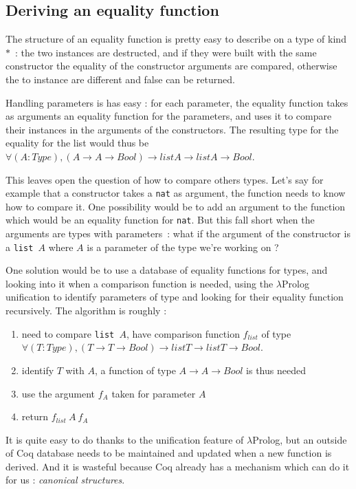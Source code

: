 \documentclass{article}
\begin{document}
\subsection{Deriving an equality function}

The structure of an equality function is pretty easy to describe on a type of
kind $*$~: the two instances are destructed, and if they were built with
the same constructor the equality of the constructor arguments are compared,
otherwise the to instance are different and false can be returned.

Handling parameters is has easy : for each parameter, the equality function
takes as arguments an equality function for the parameters, and uses it to
compare their instances in the arguments of the constructors. The resulting
type for the equality for the list would thus be
$\forall (A : Type), (A \rightarrow A \rightarrow Bool) \rightarrow
list A \rightarrow list A \rightarrow Bool$.

This leaves open the question of how to compare others types. Let's say for
example that a constructor takes a \texttt{nat} as argument, the function needs
to know how to compare it. One possibility would be to add an argument to the
function which would be an equality function for \texttt{nat}. But this fall
short when the arguments are types with parameters~: what if the argument of
the constructor is a \texttt{list $A$} where $A$ is a parameter of the type
we're working on ?

One solution would be to use a database of equality functions for types, and
looking into it when a comparison function is needed, using the $\lambda$Prolog
unification to identify parameters of type and looking for their equality function
recursively. The algorithm is roughly :\begin{enumerate}
    \item need to compare \texttt{list $A$}, have comparison function $f_{list}$ of type
        $\forall (T : Type), (T \rightarrow T \rightarrow Bool) \rightarrow
        list T \rightarrow list T \rightarrow Bool$.
    \item identify $T$ with $A$, a function of type $A \rightarrow A \rightarrow Bool$
        is thus needed
    \item use the argument $f_A$ taken for parameter $A$
    \item return $f_{list}\ A\ f_A$
\end{enumerate}

It is quite easy to do thanks to the unification feature of $\lambda$Prolog,
but an outside of Coq database needs to be maintained and updated when a new
function is derived. And it is wasteful because Coq already has a mechanism
which can do it for us : \emph{canonical structures}.
\end{document}
